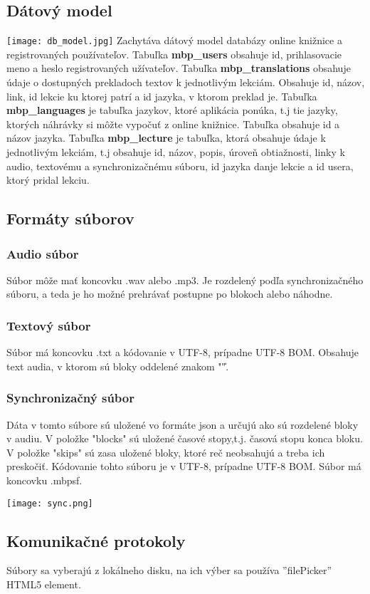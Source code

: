 \documentclass{article}
\begin{document}
\subsection{Dátový model}
\texttt{[image: db\_model.jpg]}
Zachytáva dátový model databázy online knižnice a registrovaných používateľov.
Tabuľka \textbf{mbp\_users} obsahuje id, prihlasovacie meno a heslo registrovaných užívateľov. 
Tabuľka \textbf{mbp\_translations} obsahuje údaje o dostupných prekladoch textov k jednotlivým lekciám. Obsahuje id, názov, link, id lekcie ku ktorej patrí a id jazyka, v ktorom preklad je.
Tabuľka \textbf{mbp\_languages} je tabuľka jazykov, ktoré aplikácia ponúka, t.j tie jazyky, ktorých náhrávky si môžte vypočuť z online knižnice. Tabuľka obsahuje id a názov jazyka.
Tabuľka \textbf{mbp\_lecture} je tabuľka, ktorá obsahuje údaje k jednotlivým lekciám, t.j obsahuje id, názov, popis, úroveň obtiažnosti, linky k audio, textovému a synchronizačnému súboru, id jazyka danje lekcie a id usera, ktorý pridal lekciu.

\subsection{Formáty súborov}
\subsubsection{Audio súbor}
Súbor môže mať koncovku .wav alebo .mp3. Je rozdelený podľa synchronizačného súboru, a teda je ho možné prehrávať postupne po blokoch alebo náhodne.
\subsubsection{Textový súbor}
Súbor má koncovku .txt a kódovanie v UTF-8, prípadne UTF-8 BOM. Obsahuje text audia, v ktorom sú bloky oddelené znakom "\|".
\subsubsection{Synchronizačný súbor}
Dáta v tomto súbore sú uložené vo formáte json a určujú ako sú rozdelené bloky v audiu. V položke "blocks" sú uložené časové stopy,t.j. časová stopu konca bloku.
V položke "skips" sú zasa uložené bloky, ktoré reč neobsahujú a treba ich preskočiť. Kódovanie tohto súboru je v UTF-8, prípadne UTF-8 BOM. Súbor má koncovku .mbpsf.

\texttt{[image: sync.png]}


\subsection{Komunikačné protokoly}
Súbory sa vyberajú z lokálneho disku, na ich výber sa používa ''filePicker'' HTML5 element.
\end{document}
